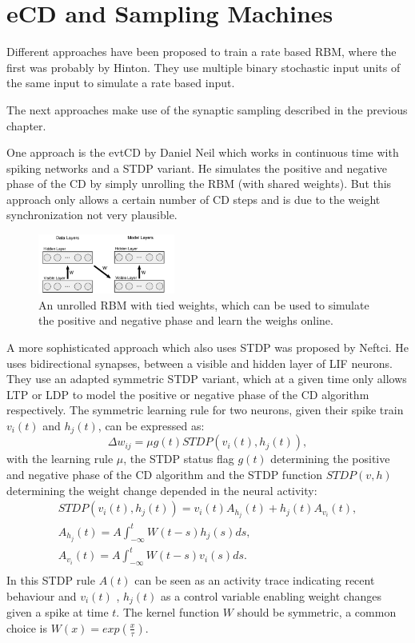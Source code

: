 \section{eCD and Sampling Machines}

Different approaches have been proposed to train a rate based RBM, where the first was probably by Hinton.
They use multiple binary stochastic input units of the same input to simulate a rate based input.

The next approaches make use of the synaptic sampling described in the previous chapter.

One approach is the evtCD by Daniel Neil which works in continuous time with spiking networks and a STDP variant.
He simulates the positive and negative phase of the CD by simply unrolling the RBM (with shared weights). 
But this approach only allows a certain number of CD steps and is due to the weight synchronization not very plausible.

\begin{figure}
	\centering
    	\includegraphics[width=0.4\textwidth]{imgs/evtCD.png} 
    \caption{An unrolled RBM with tied weights, which can be used to simulate the positive and negative phase and learn the weighs online.}
	\label{fig:evtCD}
\end{figure}

A more sophisticated approach which also uses STDP was proposed by Neftci.
He uses bidirectional synapses, between a visible and hidden layer of LIF neurons.
They use an adapted symmetric STDP variant, which at a given time only allows LTP or LDP to model the positive or negative phase of the CD algorithm respectively. 
The symmetric learning rule for two neurons, given their spike train $v_i(t)$ and $h_j(t)$, can be expressed as:
\[
\Delta w_{ij} = \mu g(t) STDP(v_i(t), h_j(t)),
\]
with the learning rule $\mu$, the STDP status flag $g(t)$ determining the positive and negative phase of the CD algorithm and the STDP function $STDP(v, h)$ determining the weight change depended in the neural activity:
\[
\begin{split}
STDP(v_i(t), h_j(t)) = v_i(t) A_{h_j}(t) + h_j(t) A_{v_i}(t), \\
A_{h_j}(t) = A \int_{- \infty}^t W(t-s) h_j(s) ds, \\ 
A_{v_i}(t) = A \int_{- \infty}^t W(t-s) v_i(s) ds. \\ 
\end{split}
\]
In this STDP rule $A(t)$ can be seen as an activity trace indicating recent behaviour and $v_i(t)$ , $h_j(t)$ as a control variable enabling weight changes given a spike at time $t$.    
The kernel function $W$ should be symmetric, a common choice is $W(x) = exp(\frac{x}{\tau})$. 

